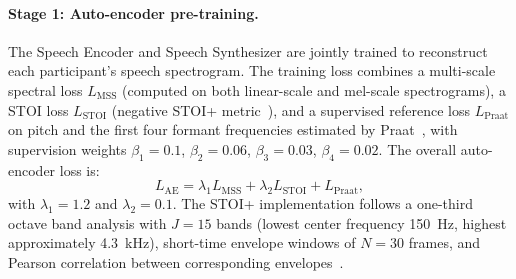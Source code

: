 \documentclass[10pt]{article}
\begin{document}
\paragraph{Stage 1: Auto-encoder pre-training.}
The Speech Encoder and Speech Synthesizer are jointly trained to reconstruct each participant's speech spectrogram. The training loss combines a multi-scale spectral loss $L_{\mathrm{MSS}}$ (computed on both linear-scale and mel-scale spectrograms), a STOI loss $L_{\mathrm{STOI}}$ (negative STOI+ metric~\cite{taal2011algorithm}), and a supervised reference loss $L_{\mathrm{Praat}}$ on pitch and the first four formant frequencies estimated by Praat~\cite{boersma2001praat}, with supervision weights $\beta_1=0.1$, $\beta_2=0.06$, $\beta_3=0.03$, $\beta_4=0.02$. The overall auto-encoder loss is:
\begin{equation}
L_{\mathrm{AE}} = \lambda_1 L_{\mathrm{MSS}} + \lambda_2 L_{\mathrm{STOI}} + L_{\mathrm{Praat}},
\end{equation}
with $\lambda_1=1.2$ and $\lambda_2=0.1$. The STOI+ implementation follows a one-third octave band analysis with $J=15$ bands (lowest center frequency 150~Hz, highest approximately 4.3~kHz), short-time envelope windows of $N=30$ frames, and Pearson correlation between corresponding envelopes~\cite{relanoiborra2016sepsm}.
\end{document}
